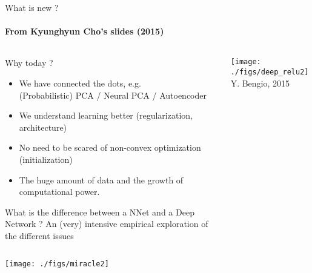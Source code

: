 \begin{frame}{What is new ?}
\framesubtitle{From Kyunghyun Cho's slides (2015)}
\begin{columns}
  \begin{column}{0.6\textwidth}
    \begin{block}{Why today ?}
      \begin{itemize}
      \item We have connected the dots, e.g. \\
        (Probabilistic) PCA / Neural PCA / Autoencoder
      \item We understand learning better (regularization,
        architecture)
      \item No need to be scared of non-convex optimization
        (initialization)
      \item  {\color{red} The huge amount of data and the growth of computational
        power.}
      \end{itemize}
    \end{block}
    \begin{block}{What is the difference between a NNet and a Deep
        Network ?}
      An (very) intensive empirical exploration of the different issues
    \end{block}
  \end{column}    
  \begin{column}{0.4\textwidth}
    \texttt{[image: ./figs/deep\_relu2]}
{\vfill\footnotesize{Y. Bengio, 2015}}
  \end{column}
\end{columns}
\end{frame}

\begin{frame}
  \begin{center}
    \texttt{[image: ./figs/miracle2]}\\
  \end{center}
\end{frame}
 
\endinput



